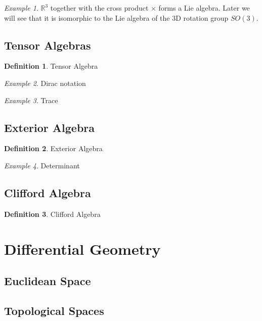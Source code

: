 \documentclass[12pt]{article}
\theoremstyle{definition}
\newtheorem{definition}{Definition}[section]
\theoremstyle{remark}
\theoremstyle{example}
\newtheorem{example}{Example}
\begin{document}
\begin{example}
	$\mathbb{R}^3$ together with the cross product $\times$ forms a Lie algebra. Later we will see that it is isomorphic to the Lie algebra of the 3D rotation group $SO(3)$.
\end{example}

\subsection{Tensor Algebras}

\begin{definition}
	Tensor Algebra
\end{definition}

\begin{example}
	Dirac notation
\end{example}

\begin{example}
	Trace
\end{example}

\subsection{Exterior Algebra}

\begin{definition}
	Exterior Algebra
\end{definition}

\begin{example}
	Determinant
\end{example}

\subsection{Clifford Algebra}

\begin{definition}
	Clifford Algebra
\end{definition}

\section{Differential Geometry}

\subsection{Euclidean Space}

\subsection{Topological Spaces}
\end{document}
